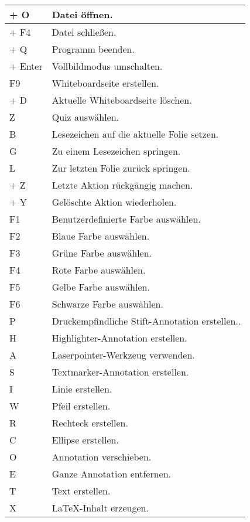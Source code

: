 \begin{longtable}{|p{}|l|}
	\hline
	{\ctrlKey} + O & Datei öffnen.\\
	\hline
	{\ctrlKey} + F4 & Datei schließen.\\
	\hline
	{\ctrlKey} + Q & Programm beenden.\\
	\hline
	{\altKey} + Enter & Vollbildmodus umschalten.\\
	\hline
	F9 & Whiteboardseite erstellen.\\
	\hline
	{\ctrlKey} + D & Aktuelle Whiteboardseite löschen.\\
	\hline
	Z & Quiz auswählen.\\
	\hline
	B & Lesezeichen auf die aktuelle Folie setzen.\\
	\hline
	G & Zu einem Lesezeichen springen.\\
	\hline
	L & Zur letzten Folie zurück springen.\\
	\hline
	{\ctrlKey} + Z & Letzte Aktion rückgängig machen.\\
	\hline
	{\ctrlKey} + Y & Gelöschte Aktion wiederholen.\\
	\hline
	F1 & Benutzerdefinierte Farbe auswählen.\\
	\hline
	F2 & Blaue Farbe auswählen.\\
	\hline
	F3 & Grüne Farbe auswählen.\\
	\hline
	F4 & Rote Farbe auswählen.\\
	\hline
	F5 & Gelbe Farbe auswählen.\\
	\hline
	F6 & Schwarze Farbe auswählen.\\
	\hline
	P & Druckempfindliche Stift-Annotation erstellen..\\
	\hline
	H & Highlighter-Annotation erstellen.\\
	\hline
	A & Laserpointer-Werkzeug verwenden.\\
	\hline
	S & Textmarker-Annotation erstellen.\\
	\hline
	I & Linie erstellen.\\
	\hline
	W & Pfeil erstellen.\\
	\hline
	R & Rechteck erstellen.\\
	\hline
	C & Ellipse erstellen.\\
	\hline
	O & Annotation verschieben.\\
	\hline
	E & Ganze Annotation entfernen.\\
	\hline
	T & Text erstellen.\\
	\hline
	X & LaTeX-Inhalt erzeugen.\\

\end{longtable}
